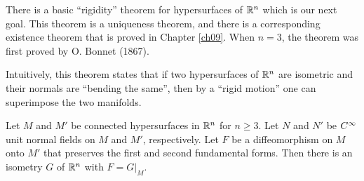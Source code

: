 \documentclass[../main]{subfiles}
\begin{document}
There is a basic ``rigidity'' theorem for hypersurfaces of $\mathbb{R}^n$ which is our next goal. This theorem is a uniqueness theorem, and there is a corresponding existence theorem that is proved in Chapter \ref{ch09}. When $n=3$, the theorem was first proved by O. Bonnet (1867).

Intuitively, this theorem states that if two hypersurfaces of $\mathbb{R}^n$ are isometric and their normals are ``bending the same'', then by a ``rigid motion'' one can superimpose the two manifolds.



\begin{theorem} \label{thm:ch6.5.3}
Let $M$ and $M'$ be connected hypersurfaces in $\mathbb{R}^n$ for $n\ge3$. Let $N$ and $N'$ be $C^\infty$ unit normal fields on $M$ and $M'$, respectively. Let $F$ be a diffeomorphism on $M$ onto $M'$ that preserves the first and second fundamental forms. Then there is an isometry $G$ of $\mathbb{R}^n$ with $F=G|_M$.
\end{theorem}
\end{document}
